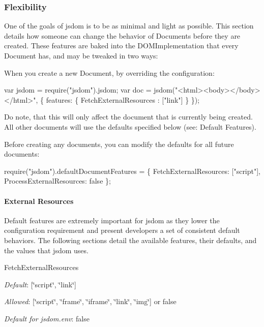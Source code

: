 \subsubsection*{Flexibility}

One of the goals of jsdom is to be as minimal and light as possible. This section details how someone can change the behavior of {\ttfamily Document}s before they are created. These features are baked into the {\ttfamily D\+O\+M\+Implementation} that every {\ttfamily Document} has, and may be tweaked in two ways\+:


\begin{DoxyEnumerate}
\item When you create a new {\ttfamily Document}, by overriding the configuration\+:
\end{DoxyEnumerate}


\begin{DoxyCode}
var jsdom = require("jsdom").jsdom;
var doc = jsdom("<html><body></body></html>", \{
    features: \{
      FetchExternalResources : ["link"]
    \}
\});
\end{DoxyCode}


Do note, that this will only affect the document that is currently being created. All other documents will use the defaults specified below (see\+: Default Features).


\begin{DoxyEnumerate}
\item Before creating any documents, you can modify the defaults for all future documents\+:
\end{DoxyEnumerate}


\begin{DoxyCode}
require("jsdom").defaultDocumentFeatures = \{
    FetchExternalResources: ["script"],
    ProcessExternalResources: false
\};
\end{DoxyCode}


\paragraph*{External Resources}

Default features are extremely important for jsdom as they lower the configuration requirement and present developers a set of consistent default behaviors. The following sections detail the available features, their defaults, and the values that jsdom uses.

{\ttfamily Fetch\+External\+Resources}


\begin{DoxyItemize}
\item {\itshape Default}\+: {\ttfamily \mbox{[}\char`\"{}script\char`\"{}, \char`\"{}link\char`\"{}\mbox{]}}
\item {\itshape Allowed}\+: {\ttfamily \mbox{[}\char`\"{}script\char`\"{}, \char`\"{}frame\char`\"{}, \char`\"{}iframe\char`\"{}, \char`\"{}link\char`\"{}, \char`\"{}img\char`\"{}\mbox{]}} or {\ttfamily false}
\item {\itshape Default for {\ttfamily jsdom.\+env}}\+: {\ttfamily false}
\end{DoxyItemize}

